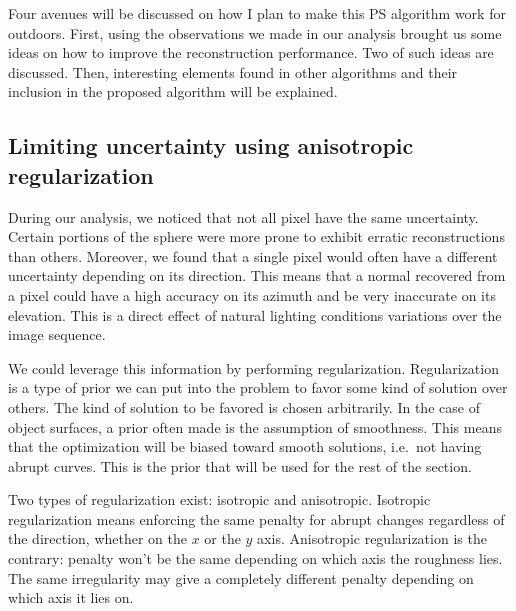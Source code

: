 
Four avenues will be discussed on how I plan to make this PS algorithm work for outdoors. First, using the observations we made in our analysis brought us some ideas on how to improve the reconstruction performance. Two of such ideas are discussed. Then, interesting elements found in other algorithms and their inclusion in the proposed algorithm will be explained.

\subsection{Limiting uncertainty using anisotropic regularization}
\label{subsec:reg}

During our analysis, we noticed that not all pixel have the same uncertainty. Certain portions of the sphere were more prone to exhibit erratic reconstructions than others. Moreover, we found that a single pixel would often have a different uncertainty depending on its direction. This means that a normal recovered from a pixel could have a high accuracy on its azimuth and be very inaccurate on its elevation. This is a direct effect of natural lighting conditions variations over the image sequence.

We could leverage this information by performing regularization. Regularization is a type of prior we can put into the problem to favor some kind of solution over others. The kind of solution to be favored is chosen arbitrarily. In the case of object surfaces, a prior often made is the assumption of smoothness. This means that the optimization will be biased toward smooth solutions, i.e.\ not having abrupt curves. This is the prior that will be used for the rest of the section.

Two types of regularization exist: isotropic and anisotropic. Isotropic regularization means enforcing the same penalty for abrupt changes regardless of the direction, whether on the $x$ or the $y$ axis. Anisotropic regularization is the contrary: penalty won't be the same depending on which axis the roughness lies. The same irregularity may give a completely different penalty depending on which axis it lies on.

